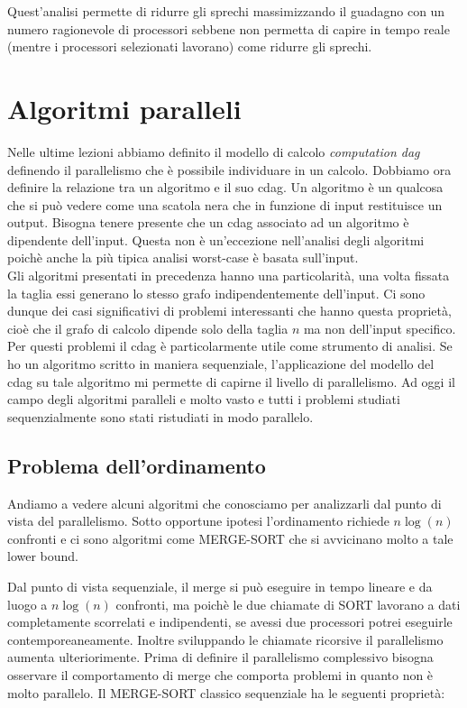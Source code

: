 \documentclass[a4paper,portrait,12pt]{article}
\theoremstyle{definition}
\begin{document}
Quest’analisi permette di ridurre gli sprechi massimizzando il guadagno con un numero ragionevole di processori sebbene non permetta di capire in tempo reale (mentre i processori selezionati lavorano) come ridurre gli sprechi.


\section{Algoritmi paralleli}

Nelle ultime lezioni abbiamo definito il modello di calcolo \textit{computation dag} definendo il parallelismo che è possibile individuare in un calcolo.
Dobbiamo ora definire la relazione tra un algoritmo e il suo cdag.
Un algoritmo è un qualcosa che si può vedere come una scatola nera che in funzione di input restituisce
un output.
Bisogna tenere presente che un cdag associato ad un algoritmo è dipendente dell’input.
Questa non è un’eccezione nell’analisi degli algoritmi poichè anche la più tipica analisi worst-case è basata sull’input.\\	

Gli algoritmi presentati in precedenza hanno una particolarità, una volta fissata la taglia essi generano lo stesso grafo indipendentemente dell’input.
Ci sono dunque dei casi significativi di problemi interessanti che hanno questa proprietà, cioè che il grafo di calcolo dipende solo della taglia $n$ ma non
dell’input specifico.
Per questi problemi il cdag è particolarmente utile come strumento di analisi.
Se ho un algoritmo scritto in maniera sequenziale, l’applicazione del modello del cdag su tale algoritmo mi permette di capirne il livello di parallelismo.
Ad oggi il campo degli algoritmi paralleli e molto vasto e tutti i problemi studiati sequenzialmente sono stati ristudiati in modo parallelo.


\subsection{Problema dell'ordinamento}

Andiamo a vedere alcuni algoritmi che conosciamo per analizzarli dal punto di vista del parallelismo.
Sotto opportune ipotesi l’ordinamento richiede $n\log(n)$ confronti e ci sono algoritmi come MERGE-SORT che si avvicinano molto a tale lower bound.

Dal punto di vista sequenziale, il merge si può eseguire in tempo lineare e da luogo a $n\log(n)$ confronti, ma poichè le due chiamate di SORT lavorano a dati completamente scorrelati e indipendenti, se avessi due processori potrei eseguirle contemporeaneamente.
Inoltre sviluppando le chiamate ricorsive il parallelismo aumenta ulteriorimente.
Prima di definire il parallelismo complessivo bisogna osservare il comportamento di merge che comporta problemi in quanto non è molto parallelo.
Il MERGE-SORT classico sequenziale ha le seguenti proprietà:
\end{document}
